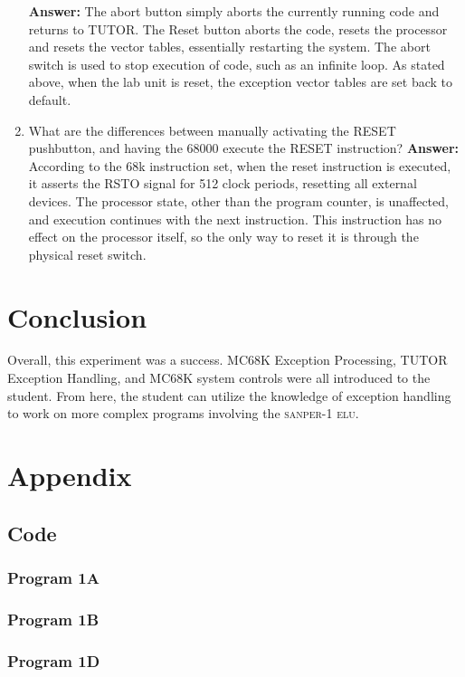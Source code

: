 \documentclass[12pt, twocolumn]{article}
\begin{document}
\begin{enumerate}
	\subitem \hspace{-0.7cm}\textbf{Answer:} The abort button simply aborts the currently running code and returns to TUTOR. The Reset button aborts the code, resets the processor and resets the vector tables, essentially restarting the system. The abort switch is used to stop execution of code, such as an infinite loop. As stated above, when the lab unit is reset, the exception vector tables are set back to default.
	\item What are the differences between manually activating the RESET pushbutton, and having the 68000 execute the RESET instruction?
	\subitem \hspace{-0.7cm}\textbf{Answer:} According to the 68k instruction set, when the reset instruction is executed, it asserts the RSTO signal for 512 clock periods, resetting all external devices. The processor state, other than the program counter, is unaffected, and execution continues with the next instruction. This instruction has no effect on the processor itself, so the only way to reset it is through the physical reset switch.
\end{enumerate}


\section{Conclusion} 
Overall, this experiment was a success. MC68K Exception Processing, TUTOR Exception Handling, and MC68K system controls were all introduced to the student. From here, the student can utilize the knowledge of exception handling to work on more complex programs involving the \textsc{sanper-1 elu.}
\onecolumn
\section{Appendix}
\label{appendix}
\subsection{Code}\label{code}
\lstset{language=[Motorola68k]Assembler}
\subsubsection{Program 1A}\label{prog1A}

\subsubsection{Program 1B}\label{prog1B}

\subsubsection{Program 1D}\label{prog1D}

\end{document}

